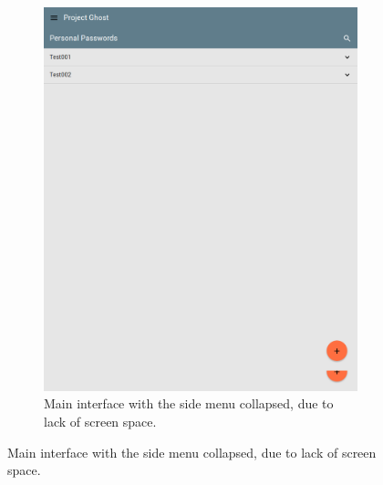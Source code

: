\begin{figure}
			\begin{subfigure}[b]{0.75\textwidth}
				\includegraphics[width=\linewidth,clip,trim=0 800 200 0]{figures/implementation/screenshots/ghost_main_collapsed_menu.png}
				\caption{Main interface with the side menu collapsed, due to lack of screen space.}
				\label{fig:impl:responsive:collapsed}
			\end{subfigure}


\end{figure}
